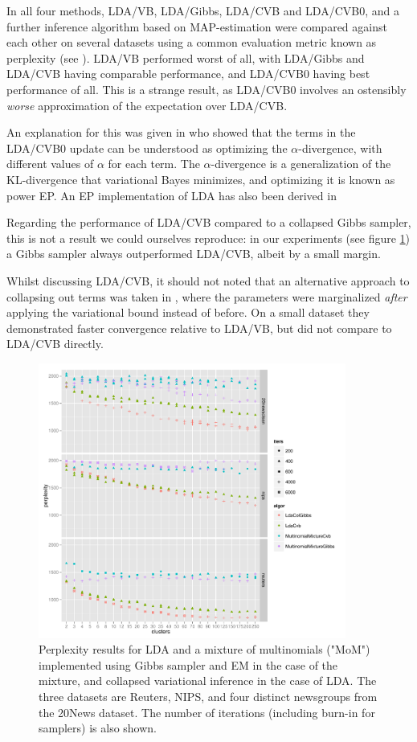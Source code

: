 In \cite{Asuncion2012} all four methods, LDA/VB, LDA/Gibbs, LDA/CVB and LDA/CVB0, and a further inference algorithm based on MAP-estimation were compared against each other on several datasets using a common evaluation metric known as perplexity (see ). LDA/VB performed worst of all, with LDA/Gibbs and LDA/CVB having comparable performance, and LDA/CVB0 having best performance of all. This is a strange result, as LDA/CVB0 involves an ostensibly \emph{worse} approximation of the expectation over LDA/CVB. 

An explanation for this was given in\cite{Sato2012} who showed that the terms in the LDA/CVB0 update can be understood as optimizing the $\alpha$-divergence\cite{Minka2005}, with different values of $\alpha$ for each term. The $\alpha$-divergence is a generalization of the KL-divergence that variational Bayes minimizes, and optimizing it is known as power EP. An EP implementation of LDA has also been derived in \cite{Minka2002}

Regarding the performance of LDA/CVB compared to a collapsed Gibbs sampler, this is not a result we could ourselves reproduce: in our experiments (see figure \ref{fig:nip-reuters-20news-tests}) a Gibbs sampler always outperformed LDA/CVB, albeit by a small margin.

Whilst discussing LDA/CVB, it should not noted that an alternative approach to collapsing out terms was taken in \cite{Hensman2012}, where the parameters were marginalized \emph{after} applying the variational bound instead of before. On a small dataset they demonstrated faster convergence relative to LDA/VB, but did not compare to LDA/CVB directly.


\begin{figure}
  \centering
    \includegraphics[width=0.9\textwidth]{plots/results-2013-03-18.pdf}
  \caption{Perplexity results for LDA and a mixture of multinomials ("MoM") implemented using Gibbs sampler and EM in the case of the mixture, and collapsed variational inference in the case of LDA. The three datasets are Reuters, NIPS, and four distinct newsgroups from the 20News dataset. The number of iterations (including burn-in for samplers) is also shown.}
  \label{fig:nip-reuters-20news-tests}
\end{figure}

